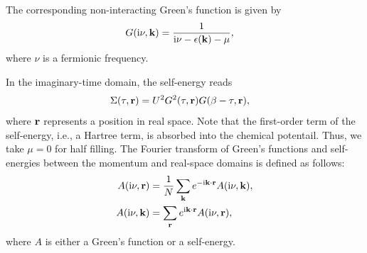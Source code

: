 \documentclass[submission, LectureNotes]{SciPost}
\newcommand{\bk}{\ensuremath{{\bf k}}}
\newcommand{\br}{\ensuremath{{\bf r}}}
\newcommand\ii{\mathrm{i}}%
\newcommand\iv{\ii\nu}%
\begin{document}
%
%
The corresponding non-interacting Green's function is given by
\begin{align}
    G(\iv, \bk) &= \frac{1}{\iv - \epsilon(\bk) - \mu},\label{eq:Gk}
\end{align}
where $\nu$ is a fermionic frequency.


In the imaginary-time domain, the self-energy reads
\begin{align}
    \Sigma(\tau, \br) &= U^2 G^2(\tau, \br) G(\beta-\tau, \br),\label{eq:sigma_r}
\end{align}
where $\br$ represents a position in real space.
Note that the first-order term of the self-energy, i.e., a Hartree term, is absorbed into the chemical potentail.
Thus, we take $\mu=0$ for half filling.
The Fourier transform of Green's functions and self-energies between the momentum and real-space domains is defined as follows:
\begin{align}
    A(\iv, \br) &= \frac{1}{N} \sum_{\bk} e^{-\ii \bk \cdot \br} A(\iv, \bk),\label{eq:ft-to-gr}\\
    A(\iv, \bk) &= \sum_{\br} e^{\ii \bk \cdot \br} A(\iv, \br),\label{eq:ft-to-gk}
\end{align}
where $A$ is either a Green's function or a self-energy.
\end{document}
